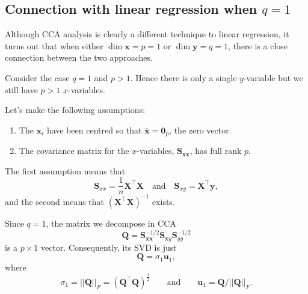 \documentclass[]{book}
\providecommand{\tightlist}{%
  \setlength{\itemsep}{0pt}\setlength{\parskip}{0pt}}
\theoremstyle{definition}
\theoremstyle{definition}
\theoremstyle{definition}
\theoremstyle{remark}
\begin{document}
\hypertarget{connection-with-linear-regression-when-q1}{%
\subsection{\texorpdfstring{Connection with linear regression when \(q=1\)}{Connection with linear regression when q=1}}\label{connection-with-linear-regression-when-q1}}

Although CCA analysis is clearly a different technique to linear regression, it turns out that when either \(\dim \boldsymbol x=p=1\) or \(\dim \boldsymbol y=q=1\), there is a close connection between the two approaches.

Consider the case \(q=1\) and \(p>1\). Hence there is only a single \(y\)-variable but we still have \(p>1\) \(x\)-variables.

Let's make the following assumptions:

\begin{enumerate}
\def\labelenumi{\arabic{enumi}.}
\tightlist
\item
  The \(\boldsymbol x_i\) have been centred so that \(\bar{\boldsymbol x}={\mathbf 0}_p\), the zero vector.
\item
  The covariance matrix for the \(x\)-variables, \(\boldsymbol S_{\boldsymbol x\boldsymbol x}\), has full rank \(p\).
\end{enumerate}

The first assumption means that
\[\boldsymbol S_{xx}=\frac{1}{n}\boldsymbol X^\top \boldsymbol X\quad \mbox{and}\quad \boldsymbol S_{xy}=\boldsymbol X^\top \boldsymbol y,\] and the second means that \((\boldsymbol X^\top \boldsymbol X)^{-1}\) exists.

Since \(q=1\), the matrix we decompose in CCA
\[
\boldsymbol Q=\boldsymbol S_{\boldsymbol x\boldsymbol x}^{-1/2} \boldsymbol S_{\boldsymbol xy}\boldsymbol S_{yy}^{-1/2}
\]
is a \(p \times 1\) vector. Consequently, its
SVD is just
\[
\boldsymbol Q=\sigma_1 \boldsymbol u_1,
\]
where
\[
\sigma_1=\vert \vert \boldsymbol Q\vert \vert_F = (\boldsymbol Q^\top \boldsymbol Q)^{\frac{1}{2}} \qquad \text{and} \qquad \boldsymbol u_1=\boldsymbol Q/\vert \vert \boldsymbol Q\vert \vert_F.
\]
\end{document}
